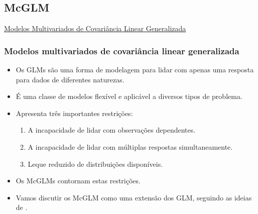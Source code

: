 \documentclass[10pt,
  aspectratio=169,
  serif,
  mathserif,
  professionalfont,
  compress,
  handout,
  ]{beamer}\usepackage[]{graphicx}\usepackage[]{color}
\begin{document}
\subsection{McGLM}


\begin{frame}[c, allowframebreaks]

\begin{center}

  {\normalsize \href{https://lineu96.github.io/st/}{Modelos Multivariados de Covariância Linear Generalizada}}
  
\end{center}

\end{frame}


\begin{frame}
  \frametitle{Modelos multivariados de covariância linear generalizada}
  \begin{itemize}
    \itemsep 2ex
  
  \item Os GLMs são uma forma de modelagem para lidar com apenas uma resposta para dados de diferentes naturezas.  
  
  \item É uma classe de modelos flexível e aplicável a diversos tipos de problema.  
  
  \item Apresenta três importantes restrições:
    \begin{enumerate}
      \item A incapacidade de lidar com observações dependentes. 
      \item A incapacidade de lidar com múltiplas respostas simultaneamente.
      \item Leque reduzido de distribuições disponíveis. 
    \end{enumerate}

  \item Os McGLMs contornam estas restrições.
  
  \item Vamos discutir os McGLM como uma extensão dos GLM, seguindo as ideias de \cite{Bonat16} . 
  
  \end{itemize}
\end{frame}
\end{document}
